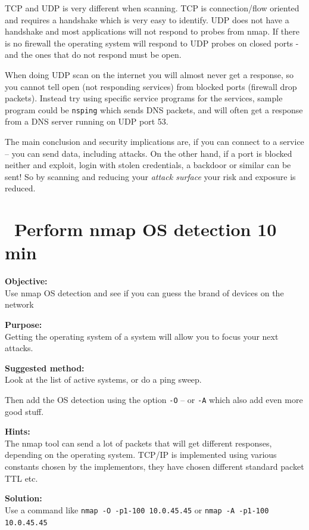 \documentclass[a4paper,11pt,notitlepage]{report}
\begin{document}
TCP and UDP is very different when scanning. TCP is connection/flow oriented and requires a handshake which is very easy to identify. UDP does not have a handshake and most applications will not respond to probes from nmap. If there is no firewall the operating system will respond to UDP probes on closed ports - and the ones that do not respond must be open.

When doing UDP scan on the internet you will almost never get a response, so you cannot tell open (not responding services) from blocked ports (firewall drop packets). Instead try using specific service programs for the services, sample program could be \verb+nsping+ which sends DNS packets, and will often get a response from a DNS server running on UDP port 53.

The main conclusion and security implications are, if you can connect to a service -- you can send data, including attacks. On the other hand, if a port is blocked neither and exploit, login with stolen credentials, a backdoor or similar can be sent! So by scanning and reducing your \emph{attack surface} your risk and exposure is reduced.


\chapter{\faInfoCircle\ Perform nmap OS detection 10 min}
\label{ex:nmap-os}

{\bf Objective:} \\
Use nmap OS detection and see if you can guess the brand of devices on the network

{\bf Purpose:}\\
Getting the operating system of a system will allow you to focus your next attacks.

{\bf Suggested method:}\\
Look at the list of active systems, or do a ping sweep.

Then add the OS detection using the option \verb+-O+ -- or \verb+-A+ which also add even more good stuff.



{\bf Hints:} \\
The nmap tool can send a lot of packets that will get different responses, depending on the operating system. TCP/IP is implemented using various constants chosen by the implementors, they have chosen different standard packet TTL etc.

{\bf Solution:}\\
Use a command like \verb+nmap -O -p1-100 10.0.45.45+ or  \verb+nmap -A -p1-100 10.0.45.45+
\end{document}
